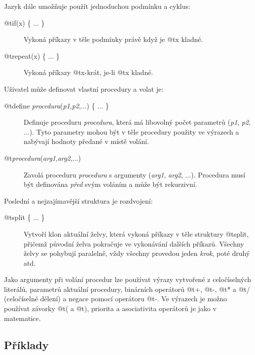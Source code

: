 Jazyk dále umožňuje použít jednoduchou podmínku a cyklus:

\begin{description}
\item[@t{if(x) \{ ... \}}] Vykoná příkazy v těle podmínky právě když je
@t{x} kladné.
\item[@t{repeat(x) \{ ... \}}] Vykoná příkazy @t{x}-krát, je-li
@t{x} kladné.
\end{description}

Uživatel může definovat vlastní procedury a volat je:

\begin{description}

\item[@t{define 
  \textit{procedura}(\textit{p1},\textit{p2},...)
  \{ ... \}
}]
  Definuje proceduru \textit{procedura}, která má libovolný počet parametrů
  (\textit{p1}, \textit{p2}, ...). Tyto parametry mohou být v těle procedury
  použity ve výrazech a nabývají hodnoty předané v místě volání.

\item[@t{\textit{procedura}(\textit{arg1},\textit{arg2},...)}]
  Zavolá proceduru \textit{procedura} s argumenty (\textit{arg1}, \textit{arg2},
  ...). Procedura musí být definována \textit{před} svým voláním a může být
  rekurzivní.

\end{description}

Poslední a nejzajímavější struktura je rozdvojení:

\begin{description}
\item[@t{split \{ ... \}}] Vytvoří klon aktuální želvy, která vykoná
příkazy v těle struktury @t{split}, přičemž původní želva pokračuje ve vykonávání
dalších příkazů. Všechny želvy se pohybují paralelně, vždy všechny provedou
jeden \emph{krok}, poté druhý atd.
\end{description}

Jako argumenty při volání procedur lze používat výrazy vytvořené z celočíselných
literálů, parametrů aktuální procedury, binárních operátorů @t{+}, @t{-},
@t{*} a @t{/} (celočíselné dělení) a negace pomocí operátoru
@t{-}. Ve výrazech je možno používat závorky @t{(} a @t{)},
priorita a asociativita operátorů je jako v matematice.

\subsection{Příklady}

